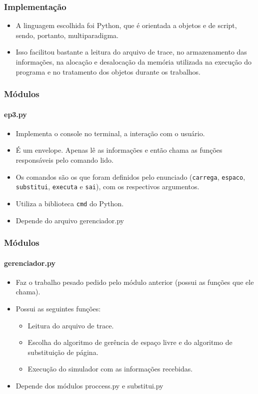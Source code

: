 \documentclass{beamer}
\begin{document}
\begin{frame}
	\frametitle{Implementação}
	\begin{itemize}
		\item A linguagem escolhida foi Python, que é orientada a objetos e de script, sendo, portanto, multiparadigma.
		\item Isso facilitou bastante a leitura do arquivo de trace, no armazenamento das informações, na alocação e desalocação da memória utilizada na execução do programa e no tratamento dos objetos durante os trabalhos.
	\end{itemize}
\end{frame}

\begin{frame}
	\frametitle{Módulos}
	\framesubtitle{ep3.py}
	\begin{itemize}
		\item Implementa o console no terminal, a interação com o usuário.
		\item É um envelope. Apenas lê as informações e então chama as funções responsáveis pelo comando lido.
		\item Os comandos são os que foram definidos pelo enunciado (\texttt{carrega}, \texttt{espaco}, \texttt{substitui}, \texttt{executa} e \texttt{sai}), com os respectivos argumentos.
		\item Utiliza a biblioteca \texttt{cmd} do Python.
		\item Depende do arquivo gerenciador.py
	\end{itemize}
\end{frame}

\begin{frame}
	\frametitle{Módulos}
	\framesubtitle{gerenciador.py}
	\begin{itemize}
		\item Faz o trabalho pesado pedido pelo módulo anterior (possui as funções que ele chama).
		\item Possui as seguintes funções:
		\begin{itemize}
			\item Leitura do arquivo de trace.
			\item Escolha do algoritmo de gerência de espaço livre e do algoritmo de substituição de página.
			\item Execução do simulador com as informações recebidas.
		\end{itemize}
		\item Depende dos módulos proccess.py e substitui.py
	\end{itemize}
\end{frame}
\end{document}
